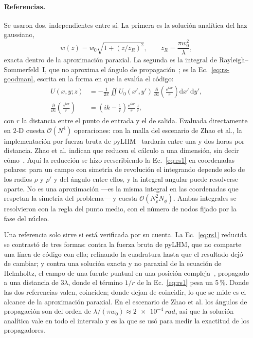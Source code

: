 \paragraph{Referencias.} Se usaron dos, independientes entre sí. La primera es
la solución analítica del haz gaussiano,
\begin{equation}
  w(z) = w_0\sqrt{1 + \left(z/z_R\right)^2}, \qquad z_R = \frac{\pi w_0^2}{\lambda},
  \label{eq:gauss}
\end{equation}
exacta dentro de la aproximación paraxial. La segunda es la integral de
Rayleigh--Sommerfeld~I, que no aproxima el ángulo de
propagación~\cite{goodman2005}; es la Ec.~\eqref{eq:rs-goodman}, escrita en la
forma en que la evalúa el código:
\begin{equation}
  \begin{split}
  U(x, y; z) &= -\frac{1}{2\pi} \iint U_0(x', y')\,
  \frac{\partial}{\partial z}\!\left(\frac{e^{ikr}}{r}\right) \mathrm{d}x'\,\mathrm{d}y',\\
  \frac{\partial}{\partial z}\!\left(\frac{e^{ikr}}{r}\right)
  &= \left(ik - \frac{1}{r}\right) \frac{e^{ikr}}{r}\,\frac{z}{r},
  \end{split}
  \label{eq:rs1}
\end{equation}
con $r$ la distancia entre el punto de entrada y el de salida. Evaluada
directamente en 2-D cuesta $\mathcal{O}(N^4)$ operaciones: con la malla del escenario de Zhao
et al., la implementación por fuerza bruta de pyLHM~\cite{pylhm} tardaría
entre una y dos horas por distancia. Zhao et al. indican que reducen el cálculo
a una dimensión, sin decir cómo~\cite{zhao2020}. Aquí la reducción se hizo
reescribiendo la Ec.~\eqref{eq:rs1} en coordenadas polares: para un campo con
simetría de revolución el integrando depende solo de los radios $\rho$ y
$\rho'$ y del ángulo entre ellos, y la integral angular puede resolverse
aparte. No es una aproximación ---es la misma integral en las coordenadas que
respetan la simetría del problema--- y cuesta $\mathcal{O}(N_\rho^2 N_\phi)$.
Ambas integrales se resolvieron con la regla del punto medio, con el número de
nodos fijado por la fase del núcleo.

Una referencia solo sirve si está verificada por su cuenta. La Ec.~\eqref{eq:rs1}
reducida se contrastó de tres formas: contra la fuerza bruta de pyLHM, que no
comparte una línea de código con ella; refinando la cuadratura hasta que el
resultado dejó de cambiar; y contra una solución exacta y no paraxial de la
ecuación de Helmholtz, el campo de una fuente puntual en una posición
compleja~\cite{deschamps1971}, propagado a una distancia de $3\lambda$, donde el
término $1/r$ de la Ec.~\eqref{eq:rs1} pesa un 5\,\%. Donde las dos
referencias valen, coinciden; donde dejan de coincidir, lo que se mide es el
alcance de la aproximación paraxial. En el escenario de Zhao et al. los ángulos
de propagación son del orden de $\lambda/(\pi w_0) \approx \SI{2e-4}{rad}$, así
que la solución analítica vale en todo el intervalo y es la que se usó para
medir la exactitud de los propagadores.


